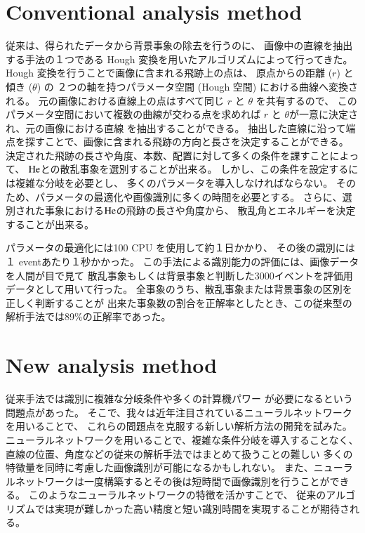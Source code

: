 \documentclass{jps-cp}
\begin{document}
\section{Conventional analysis method}
従来は、得られたデータから背景事象の除去を行うのに、
画像中の直線を抽出する手法の１つである
Hough 変換を用いたアルゴリズムによって行ってきた。
Hough 変換を行うことで画像に含まれる飛跡上の点は、
原点からの距離 ($r$) と傾き ($\theta$) の
２つの軸を持つパラメータ空間 (Hough 空間) における曲線へ変換される。
元の画像における直線上の点はすべて同じ $r$ と $\theta$ を共有するので、
このパラメータ空間において複数の曲線が交わる点を求めれば
$r$ と $\theta$が一意に決定され、元の画像における直線
を抽出することができる。
抽出した直線に沿って端点を探すことで、画像に含まれる飛跡の方向と長さを決定することができる。
決定された飛跡の長さや角度、本数、配置に対して多くの条件を課すことによって、
$\rm{He}$との散乱事象を選別することが出来る。
しかし、この条件を設定するには複雑な分岐を必要とし、
多くのパラメータを導入しなければならない。
そのため、パラメータの最適化や画像識別に多くの時間を必要とする。
さらに、選別された事象における$\rm{He}$の飛跡の長さや角度から、
散乱角とエネルギーを決定することが出来る。

パラメータの最適化には100 CPU を使用して約１日かかり、
その後の識別には１ eventあたり１秒かかった。
この手法による識別能力の評価には、画像データを人間が目で見て
散乱事象もしくは背景事象と判断した3000イベントを評価用データとして用いて行った。
全事象のうち、散乱事象または背景事象の区別を正しく判断することが
出来た事象数の割合を正解率としたとき、この従来型の解析手法では89\%の正解率であった。

\section{New analysis method}


従来手法では識別に複雑な分岐条件や多くの計算機パワー
が必要になるという問題点があった。
そこで、我々は近年注目されているニューラルネットワークを用いることで、
これらの問題点を克服する新しい解析方法の開発を試みた。
ニューラルネットワークを用いることで、複雑な条件分岐を導入することなく、
直線の位置、角度などの従来の解析手法ではまとめて扱うことの難しい
多くの特徴量を同時に考慮した画像識別が可能になるかもしれない。
また、ニューラルネットワークは一度構築するとその後は短時間で画像識別を行うことができる。
このようなニューラルネットワークの特徴を活かすことで、
従来のアルゴリズムでは実現が難しかった高い精度と短い識別時間を実現することが期待される。
\end{document}
